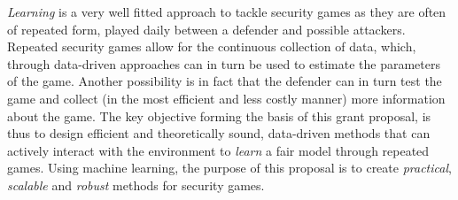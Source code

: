  {\em Learning} is a very well fitted approach to tackle security games as they are often of repeated form, played daily between a defender and possible attackers. Repeated security games allow for the continuous collection of data, which, through data-driven approaches can in turn be used to estimate the parameters of the game. Another possibility is in fact that the defender can in turn test the game and collect (in the most efficient and less costly manner) more information about the game. The key objective forming the basis of this grant proposal, is thus to design efficient and theoretically sound, data-driven methods that can actively interact with the environment to {\em learn} a fair model through repeated games. Using machine learning, the purpose of this proposal is to create \textit{practical}, \textit{scalable} and \textit{robust} methods for security games. 

 

 

